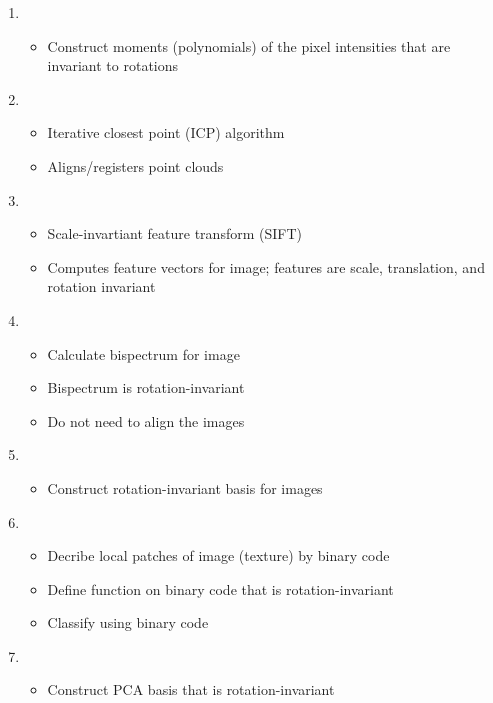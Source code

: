 \documentclass[12pt]{article}
\begin{document}
\begin{enumerate}

\item {}
\begin{itemize}
\item Construct moments (polynomials) of the pixel intensities that are invariant to rotations
\end{itemize}

\item {}
\begin{itemize}
	\item Iterative closest point (ICP) algorithm
	\item Aligns/registers point clouds
\end{itemize}

\item {}
\begin{itemize}
	\item Scale-invartiant feature transform (SIFT)
	\item Computes feature vectors for image; features are scale, translation, and rotation invariant
\end{itemize}

\item {}
\begin{itemize}
	\item Calculate bispectrum for image
	\item Bispectrum is rotation-invariant
	\item Do not need to align the images
\end{itemize}

\item {}
\begin{itemize}
	\item Construct rotation-invariant basis for images
\end{itemize}

\item {}
\begin{itemize}
	\item Decribe local patches of image (texture) by binary code
	\item Define function on binary code that is rotation-invariant
	\item Classify using binary code
\end{itemize}

\item {}
\begin{itemize}
	\item Construct PCA basis that is rotation-invariant
\end{itemize}

\end{enumerate}
\end{document}
